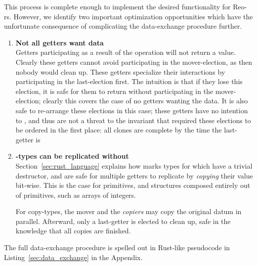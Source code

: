 This process is complete enough to implement the desired functionality for \mbox{Reo-rs}. However, we identify two important optimization opportunities which have the unfortunate consequence of complicating the data-exchange procedure further.
\begin{enumerate}
	\item \textbf{Not all getters want data}\\
	Getters participating as a result of the  operation will not return a value. Clearly these getters cannot avoid participating in the mover-election, as then nobody would clean up. These getters specialize their interactions by participating in the last-election first. The intuition is that if they lose this election, it is safe for them to return without participating in the mover-election; clearly this covers the case of no getters wanting the data. It is also safe to re-arrange these elections in this case; these getters have no intention to , and thus are not a threat to the invariant that required these elections to be ordered in the first place: all clones are complete by the time the last-getter is
	
	\item \textbf{-types can be replicated without }\\
	Section~\ref{sec:rust_language} explains how  marks types for which have a trivial destructor, and are safe for multiple getters to replicate by \textit{copying} their value bit-wise. This is the case for primitives, and structures composed entirely out of primitives, such as arrays of integers. 
	
	For copy-types, the mover and the \textit{copiers} may copy the original datum in parallel. Afterward, only a last-getter is elected to clean up, safe in the knowledge that all copies are finished.
\end{enumerate}

The full data-exchange procedure is spelled out in Rust-like pseudocode in Listing~\ref{sec:data_exchange} in the Appendix.

%
%



